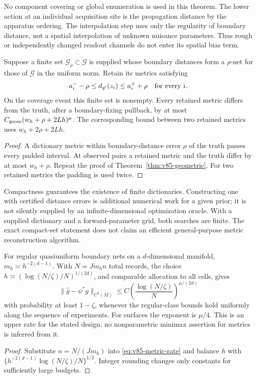 No component covering or global enumeration is used in this theorem.
The lower action at an individual acquisition site is the propagation
distance by the apparatus ordering. The interpolation step uses only
the regularity of boundary distance, not a spatial interpolation of
unknown nuisance parameters. Thus rough or independently changed
readout channels do not enter its spatial bias term.

\begin{corollary}\label{cor:v85-dictionary}
Suppose a finite set $\mathcal G_\rho\subset\mathcal G$ is supplied
whose boundary distances form a $\rho$-net for those of $\mathcal G$
in the uniform norm. Retain its metrics satisfying
\[
                    a_i^- -\rho\le d_{g'}(z_i)\le a_i^+ +\rho
                                      \quad\hbox{for every }i.
\]
On the coverage event this finite set is nonempty. Every retained
metric differs from the truth, after a boundary-fixing pullback, by
at most $C_{\rm geom}(w_h+\rho+2Lh)^\mu$. The corresponding bound
between two retained metrics uses $w_h+2\rho+2Lh$.
\end{corollary}
\begin{proof}
A dictionary metric within boundary-distance error $\rho$ of the
truth passes every padded interval. At observed pairs a retained
metric and the truth differ by at most $w_h+\rho$. Repeat the proof
of Theorem~\ref{thm:v85-geometric}. For two retained metrics the
padding is used twice.
\end{proof}
Compactness guarantees the existence of finite dictionaries. Constructing
one with certified distance errors is additional numerical work for a
given prior; it is not silently supplied by an infinite-dimensional
optimization oracle. With a supplied dictionary and a forward-parameter
grid, both searches are finite. The exact compact-set statement does
not claim an efficient general-purpose metric reconstruction algorithm.

\begin{corollary}\label{cor:v85-budget-rate}
For regular quasiuniform boundary nets on a $d$-dimensional manifold,
$m_h\asymp h^{-2(d-1)}$. With $N=Jm_hn$ total records, the choice
$h\asymp(\log(N/\zeta)/N)^{1/(2d)}$, and comparable allocation to
all cells, gives
\begin{equation}\label{eq:v85-total-rate}
             \|\widehat g-\psi^*g\|_{C^2(M)}
                \le C\left(\frac{\log(N/\zeta)}{N}\right)^{\mu/(2d)}
\end{equation}
with probability at least $1-\zeta$, whenever the regular-class
bounds hold uniformly along the sequence of experiments. For surfaces
the exponent is $\mu/4$. This is an upper rate for the stated design;
no nonparametric minimax assertion for metrics is inferred from it.
\end{corollary}
\begin{proof}
Substitute $n=N/(Jm_h)$ into \eqref{eq:v85-metric-rate} and balance
$h$ with $\{h^{-2(d-1)}\log(N/\zeta)/N\}^{1/2}$. Integer rounding
changes only constants for sufficiently large budgets.
\end{proof}

